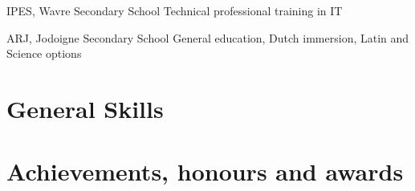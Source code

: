 \documentclass[%
    doublesided,
    paper=a4,
    fontsize=10pt,
hidelinks
]{my-resume}
\begin{document}
{        
        {IPES, Wavre}
        {Secondary School}
        {Technical professional training in IT}

        {ARJ, Jodoigne}
        {Secondary School}
        {General education, Dutch immersion, Latin and Science options}

        \section{General Skills}
        \smallskip %

        \section{Achievements, honours and awards}
        \medskip
    }
    \makebody
\end{document}
